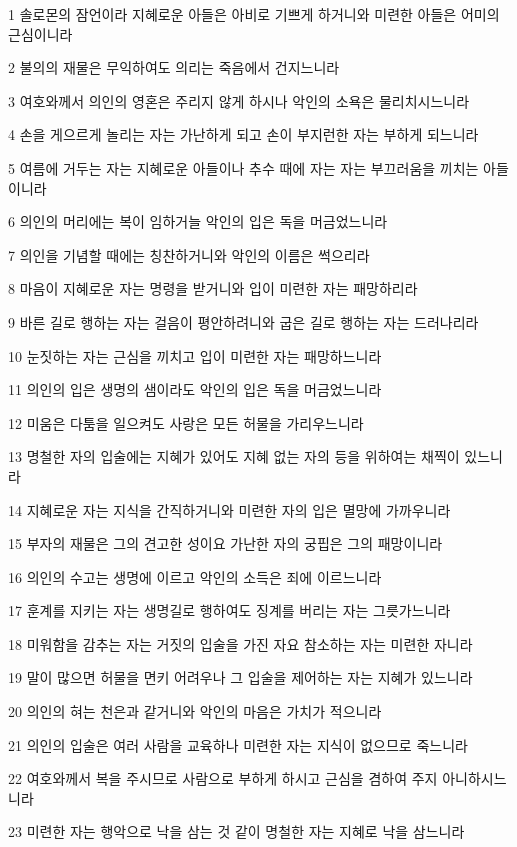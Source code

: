 \par 1 솔로몬의 잠언이라 지혜로운 아들은 아비로 기쁘게 하거니와 미련한 아들은 어미의 근심이니라
\par 2 불의의 재물은 무익하여도 의리는 죽음에서 건지느니라
\par 3 여호와께서 의인의 영혼은 주리지 않게 하시나 악인의 소욕은 물리치시느니라
\par 4 손을 게으르게 놀리는 자는 가난하게 되고 손이 부지런한 자는 부하게 되느니라
\par 5 여름에 거두는 자는 지혜로운 아들이나 추수 때에 자는 자는 부끄러움을 끼치는 아들이니라
\par 6 의인의 머리에는 복이 임하거늘 악인의 입은 독을 머금었느니라
\par 7 의인을 기념할 때에는 칭찬하거니와 악인의 이름은 썩으리라
\par 8 마음이 지혜로운 자는 명령을 받거니와 입이 미련한 자는 패망하리라
\par 9 바른 길로 행하는 자는 걸음이 평안하려니와 굽은 길로 행하는 자는 드러나리라
\par 10 눈짓하는 자는 근심을 끼치고 입이 미련한 자는 패망하느니라
\par 11 의인의 입은 생명의 샘이라도 악인의 입은 독을 머금었느니라
\par 12 미움은 다툼을 일으켜도 사랑은 모든 허물을 가리우느니라
\par 13 명철한 자의 입술에는 지혜가 있어도 지혜 없는 자의 등을 위하여는 채찍이 있느니라
\par 14 지혜로운 자는 지식을 간직하거니와 미련한 자의 입은 멸망에 가까우니라
\par 15 부자의 재물은 그의 견고한 성이요 가난한 자의 궁핍은 그의 패망이니라
\par 16 의인의 수고는 생명에 이르고 악인의 소득은 죄에 이르느니라
\par 17 훈계를 지키는 자는 생명길로 행하여도 징계를 버리는 자는 그릇가느니라
\par 18 미워함을 감추는 자는 거짓의 입술을 가진 자요 참소하는 자는 미련한 자니라
\par 19 말이 많으면 허물을 면키 어려우나 그 입술을 제어하는 자는 지혜가 있느니라
\par 20 의인의 혀는 천은과 같거니와 악인의 마음은 가치가 적으니라
\par 21 의인의 입술은 여러 사람을 교육하나 미련한 자는 지식이 없으므로 죽느니라
\par 22 여호와께서 복을 주시므로 사람으로 부하게 하시고 근심을 겸하여 주지 아니하시느니라
\par 23 미련한 자는 행악으로 낙을 삼는 것 같이 명철한 자는 지혜로 낙을 삼느니라
